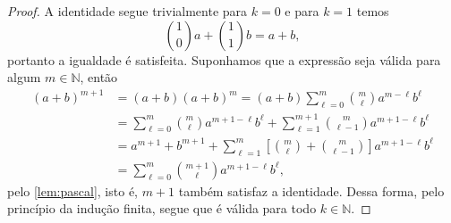 \begin{proof}
    A identidade segue trivialmente para \(k = 0\) e para \(k = 1\) temos
    \begin{equation*}
        \binom{1}{0}a + \binom{1}{1}b = a + b,
    \end{equation*}
    portanto a igualdade é satisfeita. Suponhamos que a expressão seja válida para algum \(m\in \mathbb{N}\), então
    \begin{align*}
        (a + b)^{m+1} &= (a + b) (a+b)^m = (a + b)\sum_{\ell = 0}^{m}\binom{m}{\ell} a^{m-\ell}b^{\ell}\\
                      &= \sum_{\ell = 0}^m \binom{m}{\ell} a^{m+1-\ell}b^{\ell} + \sum_{\ell = 1}^{m+1} \binom{m}{\ell-1} a^{m+1-\ell}b^{\ell}\\
                      &= a^{m+1} + b^{m+1} + \sum_{\ell=1}^{m} \left[\binom{m}{\ell} + \binom{m}{\ell-1}\right]a^{m+1-\ell}b^{\ell}\\
                      &= \sum_{\ell=0}^m\binom{m+1}{\ell} a^{m+1-\ell}b^{\ell},
    \end{align*}
    pelo \cref{lem:pascal}, isto é, \(m+1\) também satisfaz a identidade. Dessa forma, pelo princípio da indução finita, segue que é válida para todo \(k \in \mathbb{N}\).
\end{proof}

